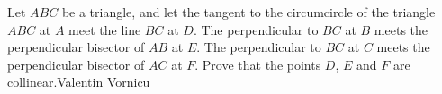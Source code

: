 Let $ABC$ be a triangle, and let the tangent to the circumcircle of the triangle $ABC$ at $A$ meet the line $BC$ at $D$. The perpendicular to $BC$ at $B$ meets the perpendicular bisector of $AB$ at $E$. The perpendicular to $BC$ at $C$ meets the perpendicular bisector of $AC$ at $F$. Prove that the points $D$,  $E$ and $F$ are collinear.Valentin Vornicu